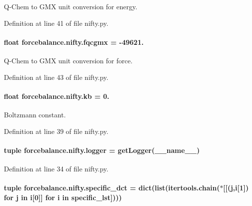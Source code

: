 Q-\/\-Chem to G\-M\-X unit conversion for energy. 



Definition at line 41 of file nifty.\-py.

\hypertarget{namespaceforcebalance_1_1nifty_ab1ec21beaae0d8328e7e4c3b89d972ab}{
\paragraph[{fqcgmx}]{\setlength{\rightskip}{0pt plus 5cm}float forcebalance.\-nifty.\-fqcgmx = -\/49621.}}\label{namespaceforcebalance_1_1nifty_ab1ec21beaae0d8328e7e4c3b89d972ab}


Q-\/\-Chem to G\-M\-X unit conversion for force. 



Definition at line 43 of file nifty.\-py.

\hypertarget{namespaceforcebalance_1_1nifty_ae0916a3186f4f8b238a0d58bb9f6a3da}{
\paragraph[{kb}]{\setlength{\rightskip}{0pt plus 5cm}float forcebalance.\-nifty.\-kb = 0.}}\label{namespaceforcebalance_1_1nifty_ae0916a3186f4f8b238a0d58bb9f6a3da}


Boltzmann constant. 



Definition at line 39 of file nifty.\-py.

\hypertarget{namespaceforcebalance_1_1nifty_a1859e992ed983dbbcc8093fdd19710e7}{
\paragraph[{logger}]{\setlength{\rightskip}{0pt plus 5cm}tuple forcebalance.\-nifty.\-logger = get\-Logger(\-\_\-\-\_\-name\-\_\-\-\_\-)}}\label{namespaceforcebalance_1_1nifty_a1859e992ed983dbbcc8093fdd19710e7}


Definition at line 34 of file nifty.\-py.

\hypertarget{namespaceforcebalance_1_1nifty_ab652c941890b0f378100433699c8d255}{
\paragraph[{specific\-\_\-dct}]{\setlength{\rightskip}{0pt plus 5cm}tuple forcebalance.\-nifty.\-specific\-\_\-dct = dict(list(itertools.\-chain($\ast$\mbox{[}\mbox{[}(j,i\mbox{[}1\mbox{]}) for j in i\mbox{[}0\mbox{]}\mbox{]} for i in {\bf specific\-\_\-lst}\mbox{]})))}}\label{namespaceforcebalance_1_1nifty_ab652c941890b0f378100433699c8d255}


